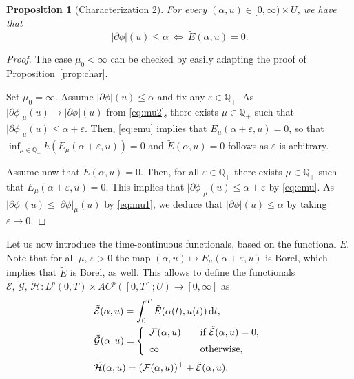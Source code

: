 \documentclass[reqno]{amsart}
\newcommand{\Qz}{\mathbb{Q}}
\newcommand{\epsi}{\varepsilon}
\renewcommand{\sl}{|\partial \phi|}
\newcommand{\GG}{{\mathcal G}}
\newcommand{\EE}{{\mathcal E}}
\newcommand{\FF}{{\mathcal F}}
\newcommand{\HH}{{\mathcal H}}
\renewcommand{\d}{{\rm d}}
\newtheorem{proposition}[theorem]{Proposition}
\begin{document}
 \begin{proposition}[Characterization 2]\label{prop:char2}  For every $(\alpha, u) \in [0,\infty) \times U$, we  have
   that
   \begin{equation}\sl(u) \leq \alpha \ \Leftrightarrow  \ \tilde
   E(\alpha,u)=0.\label{eq:char2}
   \end{equation}
 \end{proposition}
 \begin{proof}
    The case $\mu_0 <\infty$  can be checked by easily adapting
   the proof of Proposition~\ref{prop:char}.

   Set $\mu_0 = \infty$. Assume $\sl(u)\leq \alpha$
   and fix any $\epsi \in \Qz_+$. As $\sl_\mu(u) \to \sl(u)$ from
   \eqref{eq:mu2}, there exists $\mu\in \Qz_+$ such that $\sl_\mu(u) \leq
   \alpha+\epsi$. Then, \eqref{eq:emu} implies that
   $E_\mu(\alpha+\epsi,u) =0$, so that $\inf_{ \mu \in
     \Qz_+} h(E_\mu(\alpha+\epsi,u))  =0$ and $\tilde E(\alpha,u)=0$ follows
   as $\epsi $ is arbitrary.

   
   Assume  now that $\tilde E(\alpha,u)=0$. Then, for all $\epsi\in \Qz_+$
   there exists  $\mu\in \Qz_+$ such that $E_\mu(\alpha+\epsi,u)
   =0$. This implies that
   $\sl_\mu(u) \leq
   \alpha+\epsi$ by \eqref{eq:emu}. As $\sl(u) \leq \sl_\mu(u)$ by
   \eqref{eq:mu1}, we deduce that $\sl(u) \leq \alpha$ by taking
   $\epsi \to 0$.
 \end{proof}


 

Let us now introduce the time-continuous functionals, based on 
 the  functional $\tilde E$.
Note that for all $\mu,\, \epsi>0$ the map $(\alpha,u)\mapsto
E_\mu(\alpha+\epsi,u)$ is Borel, which implies that $\tilde E$ is Borel, as
well. This allows to define the functionals $\tilde \EE, \, \tilde \GG, \, \tilde \HH : L^p(0,T) \times
AC^p([0,T];U) \to [0,\infty]$ as
\begin{align*}
  &\tilde \EE(\alpha,u)=\int_0^T \tilde E(\alpha(t),u(t))\, \d t, \\
   & \tilde \GG(\alpha,u) =
     \left\{
     \begin{array}{ll}
       \FF(\alpha,u) \quad&\text{if} \ \tilde\EE (\alpha,u)=0,\\[2mm]
       \infty&\text{otherwise},
     \end{array}
               \right. \\[1mm]
  &\tilde \HH(\alpha,u) = (\FF(\alpha,u))^+ + \tilde \EE(\alpha,u).
\end{align*}
\end{document}
